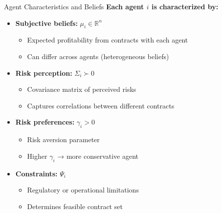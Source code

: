 \documentclass{beamer}
\begin{document}
\begin{frame}{Agent Characteristics and Beliefs}
\textbf{Each agent $i$ is characterized by:}

\begin{itemize}
    \item \textbf{Subjective beliefs:} $\mu_i \in \mathbb{R}^n$
    \begin{itemize}
        \item Expected profitability from contracts with each agent
        \item Can differ across agents (heterogeneous beliefs)
    \end{itemize}
    
    \item \textbf{Risk perception:} $\Sigma_i \succ 0$
    \begin{itemize}
        \item Covariance matrix of perceived risks
        \item Captures correlations between different contracts
    \end{itemize}
    
    \item \textbf{Risk preferences:} $\gamma_i > 0$
    \begin{itemize}
        \item Risk aversion parameter
        \item Higher $\gamma_i$ → more conservative agent
    \end{itemize}
    
    \item \textbf{Constraints:} $\Psi_i$
    \begin{itemize}
        \item Regulatory or operational limitations
        \item Determines feasible contract set
    \end{itemize}
\end{itemize}
\end{frame}
\end{document}
